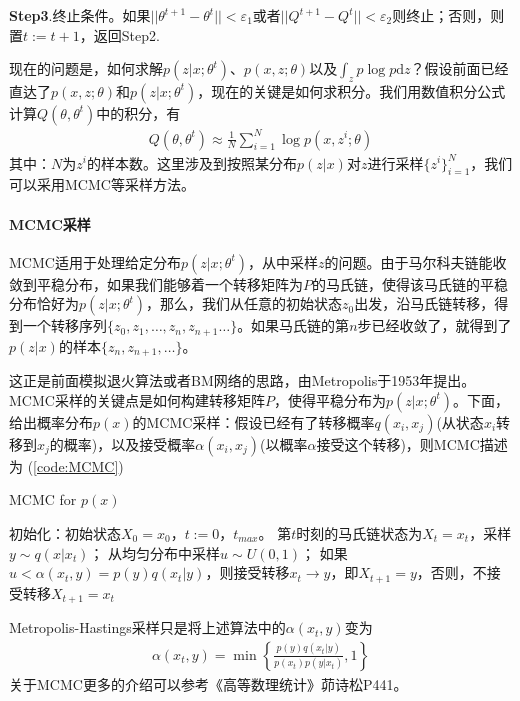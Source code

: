             \textbf{Step3}.终止条件。如果$||\theta^{t+1} - \theta^t||<\varepsilon_1$或者$||Q^{t+1} - Q^t||<\varepsilon_2$则终止；否则，则置$t:=t+1$，返回Step2.
            \par
            现在的问题是，如何求解$p(z|x;\theta^t)$、$p(x,z;\theta)$以及$\int_z p\log p\mathrm{d}z$？假设前面已经直达了$p(x,z;\theta)$和$p(z|x;\theta^t)$，现在的关键是如何求积分。我们用数值积分公式计算$Q(\theta,\theta^t)$中的积分，有
            \begin{align*}
            Q(\theta,\theta^t) \approx \frac{1}{N} \sum_{i=1}^N\log p(x,z^i;\theta)
            \end{align*}
            其中：$N$为$z^i$的样本数。这里涉及到按照某分布$p(z|x)$对$z$进行采样$\{z^i\}_{i=1}^N$，我们可以采用MCMC等采样方法。
            \paragraph{MCMC采样}
            MCMC适用于处理给定分布$p(z|x;\theta^t)$，从中采样$z$的问题。由于马尔科夫链能收敛到平稳分布，如果我们能够着一个转移矩阵为$P$的马氏链，使得该马氏链的平稳分布恰好为$p(z|x;\theta^t)$，那么，我们从任意的初始状态$z_0$出发，沿马氏链转移，得到一个转移序列$\{z_0,z_1,\dots,z_n,z_{n+1}\dots\}$。如果马氏链的第$n$步已经收敛了，就得到了$p(z|x)$的样本$\{z_{n},z_{n+1},\dots\}$。
            \par
            这正是前面模拟退火算法或者BM网络的思路，由Metropolis于1953年提出。MCMC采样的关键点是如何构建转移矩阵$P$，使得平稳分布为$p(z|x;\theta^t)$。下面，给出概率分布$p(x)$的MCMC采样：假设已经有了转移概率$q(x_i,x_j)$(从状态$x_i$转移到$x_j$的概率)，以及接受概率$ \alpha(x_i,x_j)$(以概率$\alpha$接受这个转移)，则MCMC描述为
            (\ref{code:MCMC})
            \begin{algorithm}[htbp]
                \caption{MCMC for $p(x)$}\label{code:MCMC}
                \begin{algorithmic}[1]
                    \State 初始化：初始状态$X_0 = x_0$，$t:=0$，$t_{max}$。
                        \State 第$t$时刻的马氏链状态为$X_t = x_t$，采样$y\sim q(x|x_t)$；
                        \State 从均匀分布中采样$u\sim U(0,1)$；
                        \State 如果$u < \alpha(x_t,y) = p(y)q(x_t|y)$，则接受转移$x_{t}\to y$，即$X_{t+1} = y$，否则，不接受转移$X_{t+1} = x_t$
                    \EndFor
                \end{algorithmic}
            \end{algorithm}
            \par
            Metropolis-Hastings采样只是将上述算法中的$\alpha(x_t,y)$变为
            \begin{align*}
            \alpha(x_t,y) = \min\left\{ \frac{p(y)q(x_t|y)}{p(x_t)p(y|x_t)} ,1\right\}
            \end{align*}
            关于MCMC更多的介绍可以参考《高等数理统计》茆诗松P441。
